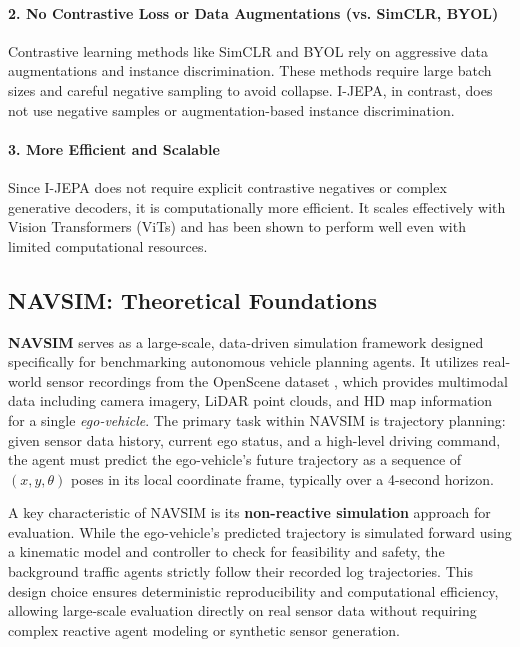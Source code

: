 \documentclass{article}
\begin{document}
\paragraph{2. No Contrastive Loss or Data Augmentations (vs. SimCLR, BYOL)} Contrastive learning methods like SimCLR \citep{chen2020simple} and BYOL \citep{grill2020bootstrap} rely on aggressive data augmentations and instance discrimination. These methods require large batch sizes and careful negative sampling to avoid collapse. I-JEPA, in contrast, does not use negative samples or augmentation-based instance discrimination. 

\paragraph{3. More Efficient and Scalable} Since I-JEPA does not require explicit contrastive negatives or complex generative decoders, it is computationally more efficient. It scales effectively with Vision Transformers (ViTs) and has been shown to perform well even with limited computational resources. 

\subsection{NAVSIM: Theoretical Foundations}
\label{sec:navsim}
\textbf{NAVSIM} \cite{dauner2024navsim} serves as a large-scale, data-driven simulation framework designed specifically for benchmarking autonomous vehicle planning agents. It utilizes real-world sensor recordings from the OpenScene dataset \cite{OpenScene2023}, which provides multimodal data including camera imagery, LiDAR point clouds, and HD map information for a single \emph{ego-vehicle}. The primary task within NAVSIM is trajectory planning: given sensor data history, current ego status, and a high-level driving command, the agent must predict the ego-vehicle's future trajectory as a sequence of $(x, y, \theta)$ poses in its local coordinate frame, typically over a 4-second horizon.

A key characteristic of NAVSIM is its \textbf{non-reactive simulation} approach for evaluation. While the ego-vehicle's predicted trajectory is simulated forward using a kinematic model and controller to check for feasibility and safety, the background traffic agents strictly follow their recorded log trajectories. This design choice ensures deterministic reproducibility and computational efficiency, allowing large-scale evaluation directly on real sensor data without requiring complex reactive agent modeling or synthetic sensor generation.
\end{document}
